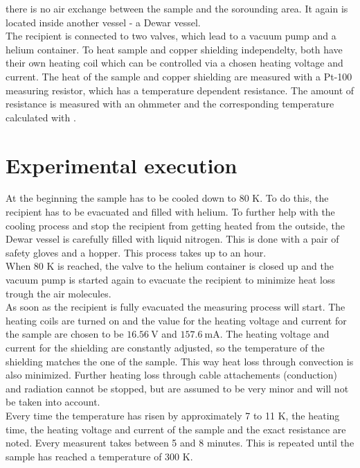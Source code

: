 there is no air exchange between the sample and the sorounding area. It again is located inside another vessel - a Dewar vessel.\\
The recipient is connected to two valves, which lead to a vacuum pump and a helium container.
To heat sample and copper shielding independelty, both have their own heating coil which can be controlled via a chosen 
heating voltage and current. The heat of the sample and copper shielding are measured with a Pt-100 measuring resistor, which
has a temperature dependent resistance. The amount of resistance is measured with an ohmmeter and the corresponding temperature
calculated with \cite{eq:resistance}.

\section{Experimental execution}

At the beginning the sample has to be cooled down to 80 K. To do this, the recipient has to be evacuated and filled with helium. To further
help with the cooling process and stop the recipient from getting heated from the outside, the Dewar vessel is carefully filled with liquid 
nitrogen. This is done with a pair of safety gloves and a hopper. This process takes up to an hour.\\
When 80 K is reached, the valve to the helium container is closed up and the vacuum pump is started again to evacuate the recipient
to minimize heat loss trough the air molecules.\\
As soon as the recipient is fully evacuated the measuring process will start. The heating coils are turned on and the value for the
heating voltage and current for the sample are chosen to be $\qty{16.56}{\volt}$ and $\qty{157.6}{\milli\ampere}$. The heating voltage and current for the shielding
are constantly adjusted, so the temperature of the shielding matches the one of the sample. This way heat loss through convection is also minimized.
Further heating loss through cable attachements (conduction) and radiation cannot be stopped, but are assumed to be very minor and will not be taken into account.\\
Every time the temperature has risen by approximately 7 to 11 K, the heating time, the heating voltage and current of the sample and the exact resistance are noted.
Every measurent takes between 5 and 8 minutes. This is repeated until the sample has reached a temperature of 300 K.